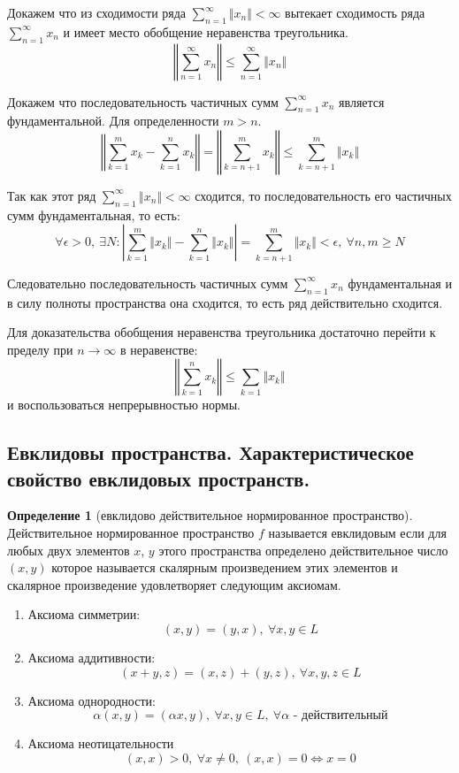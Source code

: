 \documentclass[14pt,a4paper]{extarticle}
\theoremstyle{definition}
\newtheorem{definition}{Определение}[section]
\theoremstyle{remark}
\renewcommand{\[}{\begin{dmath*}[compact]}
\renewcommand{\]}{\end{dmath*}}
\newcommand{\be}{\begin{enumerate}}
\newcommand{\ee}{\end{enumerate}}
\newcommand{\ds}{\displaystyle}
\newcommand{\sep}{ , \ \allowbreak }
\begin{document}
Докажем что из сходимости ряда $\ds\sum_{n=1}^\infty \Vert x_n \Vert < \infty$
вытекает сходимость ряда $\ds\sum_{n=1}^\infty x_n$ и имеет место обобщение
неравенства треугольника.
\[\left \Vert \sum_{n=1}^\infty x_n \right \Vert \leq
\sum_{n=1}^\infty \Vert x_n \Vert\]

Докажем что последовательность частичных сумм $\ds\sum_{n=1}^\infty x_n$
является фундаментальной.
Для определенности $m>n$.
\[{\left \Vert \sum_{k=1}^m x_k - \sum_{k=1}^n x_k \right \Vert} \allowbreak
= {\left \Vert \sum_{k=n+1}^m x_k \right \Vert} \allowbreak
\leq {\sum_{k=n+1}^m \Vert x_k \Vert}\]

Так как этот ряд $\ds\sum_{n=1}^\infty \Vert x_n \Vert < \infty$ сходится,
то последовательность его частичных сумм фундаментальная, то есть:
\[ {\forall \epsilon > 0} \sep \exists N:
{\left| \sum_{k=1}^m \Vert x_k \Vert - \sum_{k=1}^n \Vert x_k \Vert \right|}
\allowbreak = {\sum_{k=n+1}^m \Vert x_k \Vert < \epsilon}
\sep {\forall n,m \geq N} \]

Следовательно последовательность частичных сумм $\sum_{n=1}^\infty x_n$
фундаментальная и в силу полноты пространства она сходится,
то есть ряд действительно сходится.

Для доказательства обобщения неравенства треугольника достаточно перейти к
пределу при $n \to \infty$ в неравенстве:
\[ \left \Vert \sum_{k=1}^n x_k \right \Vert \leq \sum_{k=1} \Vert x_k \Vert \]
и воспользоваться непрерывностью нормы.

\subsection{Евклидовы пространства.
Характеристическое свойство евклидовых пространств.}

\begin{definition}[евклидово действительное нормированное пространство]
  Действительное нормированное пространство $f$ называется евклидовым
  если для любых двух элементов $x$, $y$ этого пространства определено
  действительное число $(x,y)$ которое называется скалярным произведением
  этих элементов и скалярное произведение удовлетворяет следующим аксиомам.

  \be
    \item Аксиома симметрии:
    \[(x,y)=(y,x) \sep {\forall x,y \in L}\]

    \item Аксиома аддитивности:
    \[ (x + y, z) = (x,z) + (y,z) \sep {\forall x,y,z \in L} \]

    \item Аксиома однородности:
    \[\alpha (x,y) = (\alpha x,y) \sep {\forall x,y \in L} \sep
    {\forall \alpha \text{ - действительный}} \]

    \item Аксиома неотицательности
    \[ (x,x) > 0 \sep\forall x\neq 0 \sep {(x,x)=0 \Leftrightarrow x=0} \]
  \ee
\end{definition}
\end{document}
